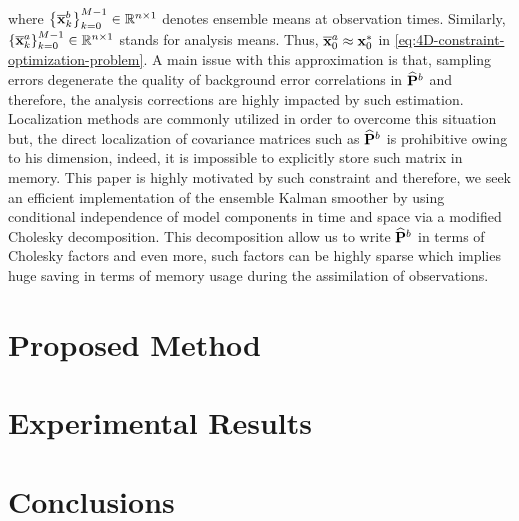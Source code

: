 where $\left \{ \overline{\bf x}^b_k \right \}_{k=0}^{M-1} \in \mathbb{R}^{n \times 1}$ denotes ensemble means at observation times. Similarly, $\left \{ \overline{\bf x}^a_k \right \}_{k=0}^{M-1} \in \mathbb{R}^{n \times 1}$ stands for analysis means. Thus, $\overline{\bf x}^a_0 \approx {\bf x}_0^{*}$ in \eqref{eq:4D-constraint-optimization-problem}. A main issue with this approximation is that, sampling errors degenerate the quality of background error correlations in $\widehat{{\bf P}}^b$ and therefore, the analysis corrections are highly impacted by such estimation. Localization methods are commonly utilized in order to overcome this situation but, the direct localization of covariance matrices such as $\widehat{{\bf P}}^b$ is prohibitive owing to his dimension, indeed, it is impossible to explicitly store such matrix in memory. This paper is highly motivated by such constraint and therefore, we seek an efficient implementation of the ensemble Kalman smoother by using conditional independence of model components in time and space via a modified Cholesky decomposition. This decomposition allow us to write $\widehat{{\bf P}}^b$ in terms of Cholesky factors and even more, such factors can be highly sparse which implies huge saving in terms of memory usage during the assimilation of observations.

\section{Proposed Method}
\label{sec:proposed-method}

\section{Experimental Results}
\label{sec:experimental-results}

\section{Conclusions}
\label{sec:conclusions}



